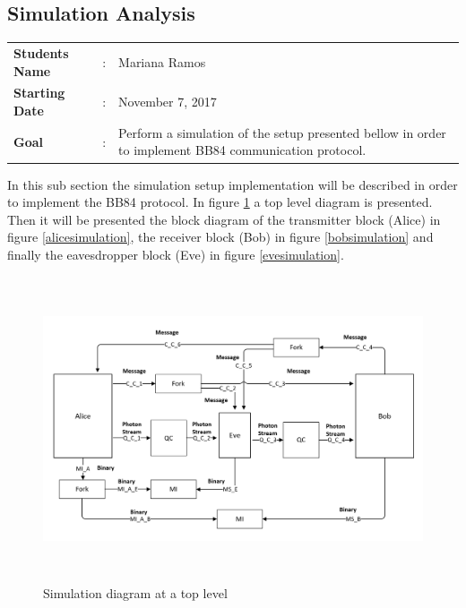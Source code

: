 \newpage

\subsection{Simulation Analysis}

\begin{tcolorbox}	
\begin{tabular}{p{2.75cm} p{0.2cm} p{10.5cm}} 	
\textbf{Students Name}  &:& Mariana Ramos \\
\textbf{Starting Date} &:& November 7, 2017\\
\textbf{Goal}          &:& Perform a simulation of the setup presented bellow in order to implement BB84 communication protocol.
\end{tabular}
\end{tcolorbox}

In this sub section the simulation setup implementation will be described in order to implement the BB84 protocol. In figure \ref{toplevelsimulation} a top level diagram is presented. Then it will be presented the block diagram of the transmitter block (Alice) in figure \ref{alicesimulation}, the receiver block (Bob) in figure \ref{bobsimulation} and finally the eavesdropper block (Eve) in figure \ref{evesimulation}.

\begin{figure}[H]
	\centering
	\includegraphics[width=1.0\textwidth, height=9cm]{./sdf/bb84_with_discrete_variables/figures/toplevel_simulation.png}
	\caption{Simulation diagram at a top level}\label{toplevelsimulation}
\end{figure}

